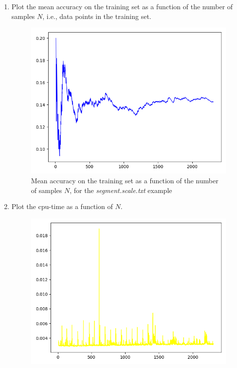 \documentclass[12pt,letterpaper]{article}
\begin{document}
\begin{enumerate}[leftmargin=!,labelindent=5pt]
    \item Plot the mean accuracy on the training set as a function of the number of samples $N$, i.e., data points in the training set.
        \begin{figure}[H]
            \centering
            \includegraphics[width=15cm]{images/log_accurate.jpg}
            \caption{Mean accuracy on the training set as a function of the number of samples $N$, for the \textit{segment.scale.txt} example}
            \label{fig:1}
        \end{figure}
    \newpage
    \item Plot the cpu-time as a function of $N$.
        \begin{figure}[H]
            \centering
            \includegraphics[width=15cm]{images/log_time.jpg}

\end{figure}
\end{enumerate}
\end{document}
